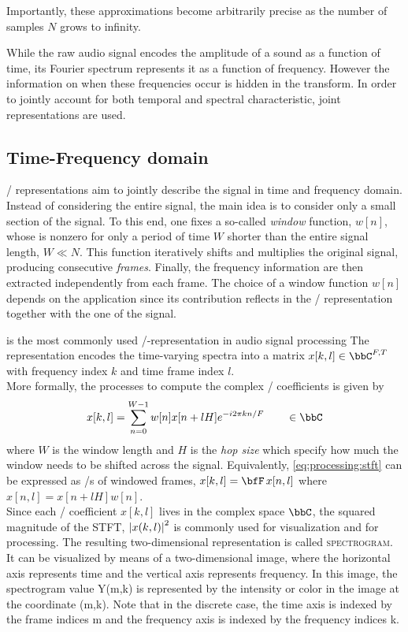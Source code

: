 Importantly, these approximations become arbitrarily precise as the number of samples $N$ grows to infinity.

While the raw audio signal encodes the amplitude of a sound as a function of time,
its Fourier spectrum represents it as a function of frequency.
However the information on when these frequencies occur is hidden in the transform.
In order to jointly account for both temporal and spectral characteristic, joint representations are used.

\subsection{Time-Frequency domain}
\TFdef/ representations aim to jointly describe the signal in time and frequency domain.
Instead of considering the entire signal, the main idea is to consider only a small section of the signal.
To this end, one fixes a so-called \textit{window} function, $w[n]$, whose is nonzero for only a period of time $W$ shorter than
the entire signal length, $W \ll N$.
This function iteratively shifts and multiplies the original signal, producing consecutive \textit{frames}.
Finally, the frequency information are then extracted independently from each frame.
The choice of a window function $w[n]$ depends on the application since its contribution reflects in the \TF/ representation together with the
one of the signal.

is the most commonly used \TF/-representation in audio signal processing
The representation encodes the time-varying spectra into a matrix $x[k,l] \in \bbC^{F,T}$ with frequency index $k$ and time frame index $l$.
\\More formally, the processes to compute the complex \STFT/ coefficients is given by
\begin{equation}\label{eq:processing:stft}
    x[k, l]  = \sum_{n=0}^{W-1} w[n] x[n + l H] \cste^{- \csti 2 \pi k n / F} \mathspace\in\bbC
\end{equation}
where $W$ is the window length and $H$ is the \textit{hop size} which specify how much the window needs to be shifted across the signal.
Equivalently, \cref{eq:processing:stft} can be expressed as \DFT/s of windowed frames, $x[k, l] = \discreteFT{x[n,l]}$ where $x[n,l] = x[n + l H] w[n]$.
\\Since each \STFT/ coefficient $x[k, l]$ lives in the complex space $\bbC$, the squared magnitude of the STFT, $\powerOf{x(k,l)}$ is
commonly used for visualization and for processing.
The resulting two-dimensional representation is called \textsc{spectrogram}.
It can be visualized by means of a two-dimensional image, where the horizontal axis represents time and the vertical axis represents frequency.
In this image, the spectrogram value Y(m,k) is represented by the intensity or color in the image at the coordinate (m,k).
Note that in the discrete case, the time axis is indexed by the frame indices m and the frequency axis is indexed by the frequency indices k.

